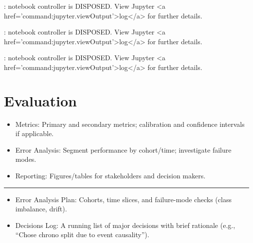 \documentclass[
  letterpaper,
  DIV=11,
  numbers=noendperiod]{scrartcl}
\providecommand{\tightlist}{%
  \setlength{\itemsep}{0pt}\setlength{\parskip}{0pt}}
\begin{document}
\begin{Highlighting}
\textcolor{black}{: }
\textcolor{black}{}\textcolor{QuartoInternalColor1}{notebook controller is DISPOSED. }
\textcolor{QuartoInternalColor1}{}\textcolor{QuartoInternalColor1}{View Jupyter <a href='command:jupyter.viewOutput'>log</a> for further details.}
\end{Highlighting}

\begin{Highlighting}
\textcolor{black}{: }
\textcolor{black}{}\textcolor{QuartoInternalColor1}{notebook controller is DISPOSED. }
\textcolor{QuartoInternalColor1}{}\textcolor{QuartoInternalColor1}{View Jupyter <a href='command:jupyter.viewOutput'>log</a> for further details.}
\end{Highlighting}

\begin{Highlighting}
\textcolor{black}{: }
\textcolor{black}{}\textcolor{QuartoInternalColor1}{notebook controller is DISPOSED. }
\textcolor{QuartoInternalColor1}{}\textcolor{QuartoInternalColor1}{View Jupyter <a href='command:jupyter.viewOutput'>log</a> for further details.}
\end{Highlighting}

\section{Evaluation}\label{evaluation}

\begin{itemize}
\tightlist
\item
  Metrics: Primary and secondary metrics; calibration and confidence
  intervals if applicable.
\item
  Error Analysis: Segment performance by cohort/time; investigate
  failure modes.
\item
  Reporting: Figures/tables for stakeholders and decision makers.
\end{itemize}

\begin{center}\rule{0.5\linewidth}{0.5pt}\end{center}

\begin{itemize}
\tightlist
\item
  Error Analysis Plan: Cohorts, time slices, and failure-mode checks
  (class imbalance, drift).
\item
  Decisions Log: A running list of major decisions with brief rationale
  (e.g., ``Chose chrono split due to event causality'').
\end{itemize}
\end{document}
